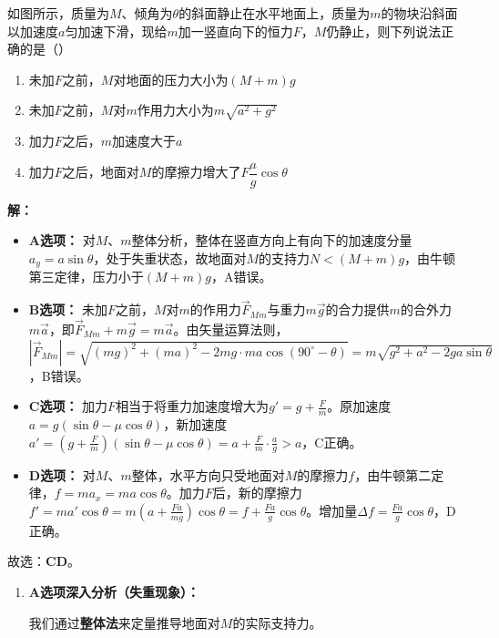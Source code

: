 \documentclass[CJKmath,a4paper,10pt]{exam-zh}
\begin{document}
\begin{liti}
如图所示，质量为$M$、倾角为$\theta$的斜面静止在水平地面上，质量为$m$的物块沿斜面以加速度$a$匀加速下滑，现给$m$加一竖直向下的恒力$F$，$M$仍静止，则下列说法正确的是（）

\begin{enumerate}
	\item[A.] 未加$F$之前，$M$对地面的压力大小为$(M+m)g$
	\item[B.] 未加$F$之前，$M$对$m$作用力大小为$m\sqrt{a^2+g^2}$
	\item[C.] 加力$F$之后，$m$加速度大于$a$
	\item[D.] 加力$F$之后，地面对$M$的摩擦力增大了$F\dfrac{a}{g}\cos\theta$
\end{enumerate}
\tcblower
\textbf{解：}

\begin{itemize}
	\item \textbf{A选项：} 对$M$、$m$整体分析，整体在竖直方向上有向下的加速度分量$a_y = a\sin\theta$，处于失重状态，故地面对$M$的支持力$N < (M+m)g$，由牛顿第三定律，压力小于$(M+m)g$，A错误。
	\item \textbf{B选项：} 未加$F$之前，$M$对$m$的作用力$\vec{F}_{Mm}$与重力$m\vec{g}$的合力提供$m$的合外力$m\vec{a}$，即$\vec{F}_{Mm} + m\vec{g} = m\vec{a}$。由矢量运算法则，$|\vec{F}_{Mm}| = \sqrt{(mg)^2 + (ma)^2 - 2mg\cdot ma \cos(90^\circ-\theta)} = m\sqrt{g^2+a^2-2ga\sin\theta}$，B错误。
	\item \textbf{C选项：} 加力$F$相当于将重力加速度增大为$g' = g + \frac{F}{m}$。原加速度$a = g(\sin\theta - \mu\cos\theta)$，新加速度$a' = (g+\frac{F}{m})(\sin\theta - \mu\cos\theta) = a + \frac{F}{m}\cdot \frac{a}{g} > a$，C正确。
	\item \textbf{D选项：} 对$M$、$m$整体，水平方向只受地面对$M$的摩擦力$f$，由牛顿第二定律，$f = m a_x = m a \cos\theta$。加力$F$后，新的摩擦力$f' = m a' \cos\theta = m (a + \frac{Fa}{mg}) \cos\theta = f + \frac{Fa}{g}\cos\theta$。增加量$\Delta f = \frac{Fa}{g}\cos\theta$，D正确。
\end{itemize}

故选：\textbf{CD}。

\begin{enumerate}
	\item \textbf{A选项深入分析（失重现象）：}

我们通过\textbf{整体法}来定量推导地面对$M$的实际支持力。


\end{enumerate}
\end{liti}
\end{document}
